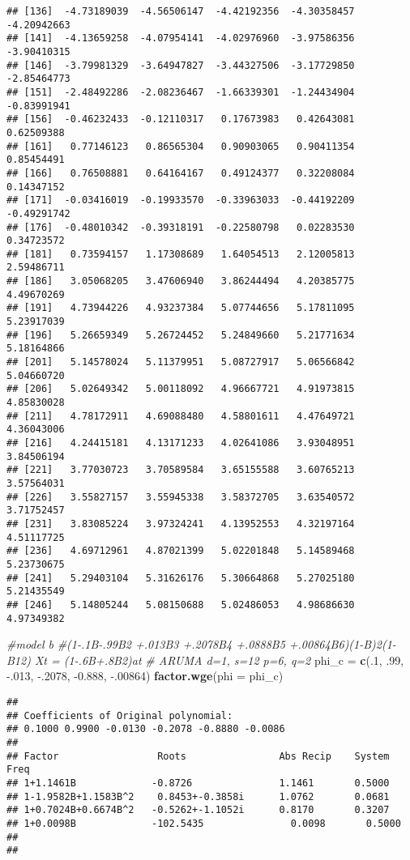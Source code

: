 \documentclass[
]{article}
\newenvironment{Shaded}{\begin{snugshade}}{\end{snugshade}}
\newcommand{\CommentTok}[1]{\textcolor[rgb]{0.56,0.35,0.01}{\textit{#1}}}
\newcommand{\DataTypeTok}[1]{\textcolor[rgb]{0.13,0.29,0.53}{#1}}
\newcommand{\DecValTok}[1]{\textcolor[rgb]{0.00,0.00,0.81}{#1}}
\newcommand{\FloatTok}[1]{\textcolor[rgb]{0.00,0.00,0.81}{#1}}
\newcommand{\KeywordTok}[1]{\textcolor[rgb]{0.13,0.29,0.53}{\textbf{#1}}}
\newcommand{\NormalTok}[1]{#1}
\newcommand{\StringTok}[1]{\textcolor[rgb]{0.31,0.60,0.02}{#1}}
\begin{document}
\begin{verbatim}
## [136]  -4.73189039  -4.56506147  -4.42192356  -4.30358457  -4.20942663
## [141]  -4.13659258  -4.07954141  -4.02976960  -3.97586356  -3.90410315
## [146]  -3.79981329  -3.64947827  -3.44327506  -3.17729850  -2.85464773
## [151]  -2.48492286  -2.08236467  -1.66339301  -1.24434904  -0.83991941
## [156]  -0.46232433  -0.12110317   0.17673983   0.42643081   0.62509388
## [161]   0.77146123   0.86565304   0.90903065   0.90411354   0.85454491
## [166]   0.76508881   0.64164167   0.49124377   0.32208084   0.14347152
## [171]  -0.03416019  -0.19933570  -0.33963033  -0.44192209  -0.49291742
## [176]  -0.48010342  -0.39318191  -0.22580798   0.02283530   0.34723572
## [181]   0.73594157   1.17308689   1.64054513   2.12005813   2.59486711
## [186]   3.05068205   3.47606940   3.86244494   4.20385775   4.49670269
## [191]   4.73944226   4.93237384   5.07744656   5.17811095   5.23917039
## [196]   5.26659349   5.26724452   5.24849660   5.21771634   5.18164866
## [201]   5.14578024   5.11379951   5.08727917   5.06566842   5.04660720
## [206]   5.02649342   5.00118092   4.96667721   4.91973815   4.85830028
## [211]   4.78172911   4.69088480   4.58801611   4.47649721   4.36043006
## [216]   4.24415181   4.13171233   4.02641086   3.93048951   3.84506194
## [221]   3.77030723   3.70589584   3.65155588   3.60765213   3.57564031
## [226]   3.55827157   3.55945338   3.58372705   3.63540572   3.71752457
## [231]   3.83085224   3.97324241   4.13952553   4.32197164   4.51117725
## [236]   4.69712961   4.87021399   5.02201848   5.14589468   5.23730675
## [241]   5.29403104   5.31626176   5.30664868   5.27025180   5.21435549
## [246]   5.14805244   5.08150688   5.02486053   4.98686630   4.97349382
\end{verbatim}

\begin{Shaded}
\begin{Highlighting}[]
\CommentTok{#model b}
\CommentTok{#(1-.1B-.99B2 +.013B3 +.2078B4 +.0888B5 +.00864B6)(1-B)2(1-B12) Xt = (1-.6B+.8B2)at}
\CommentTok{# ARUMA d=1, s=12 p=6, q=2}
\NormalTok{phi_c =}\StringTok{ }\KeywordTok{c}\NormalTok{(.}\DecValTok{1}\NormalTok{, }\FloatTok{.99}\NormalTok{, }\FloatTok{-.013}\NormalTok{, }\FloatTok{-.2078}\NormalTok{, }\FloatTok{-0.888}\NormalTok{, }\FloatTok{-.00864}\NormalTok{)}
\KeywordTok{factor.wge}\NormalTok{(}\DataTypeTok{phi =}\NormalTok{ phi_c)}
\end{Highlighting}
\end{Shaded}

\begin{verbatim}
## 
## Coefficients of Original polynomial:  
## 0.1000 0.9900 -0.0130 -0.2078 -0.8880 -0.0086 
## 
## Factor                 Roots                Abs Recip    System Freq 
## 1+1.1461B             -0.8726               1.1461       0.5000
## 1-1.9582B+1.1583B^2    0.8453+-0.3858i      1.0762       0.0681
## 1+0.7024B+0.6674B^2   -0.5262+-1.1052i      0.8170       0.3207
## 1+0.0098B             -102.5435               0.0098       0.5000
##   
## 
\end{verbatim}
\end{document}
